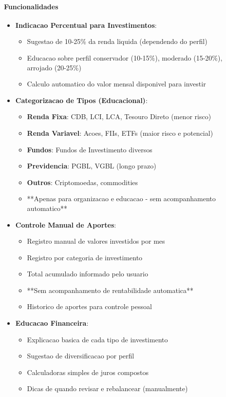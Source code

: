 \paragraph{Funcionalidades}
\begin{itemize}
    \item \textbf{Indicacao Percentual para Investimentos}:
    \begin{itemize}
        \item Sugestao de 10-25\% da renda liquida (dependendo do perfil)
        \item Educacao sobre perfil conservador (10-15\%), moderado (15-20\%), arrojado (20-25\%)
        \item Calculo automatico do valor mensal disponivel para investir
    \end{itemize}
    
    \item \textbf{Categorizacao de Tipos (Educacional)}:
    \begin{itemize}
        \item \textbf{Renda Fixa}: CDB, LCI, LCA, Tesouro Direto (menor risco)
        \item \textbf{Renda Variavel}: Acoes, FIIs, ETFs (maior risco e potencial)
        \item \textbf{Fundos}: Fundos de Investimento diversos
        \item \textbf{Previdencia}: PGBL, VGBL (longo prazo)
        \item \textbf{Outros}: Criptomoedas, commodities
        \item **Apenas para organizacao e educacao - sem acompanhamento automatico**
    \end{itemize}
    
    \item \textbf{Controle Manual de Aportes}:
    \begin{itemize}
        \item Registro manual de valores investidos por mes
        \item Registro por categoria de investimento
        \item Total acumulado informado pelo usuario
        \item **Sem acompanhamento de rentabilidade automatica**
        \item Historico de aportes para controle pessoal
    \end{itemize}
    
    \item \textbf{Educacao Financeira}:
    \begin{itemize}
        \item Explicacao basica de cada tipo de investimento
        \item Sugestao de diversificacao por perfil
        \item Calculadoras simples de juros compostos
        \item Dicas de quando revisar e rebalancear (manualmente)
    \end{itemize}
\end{itemize}

